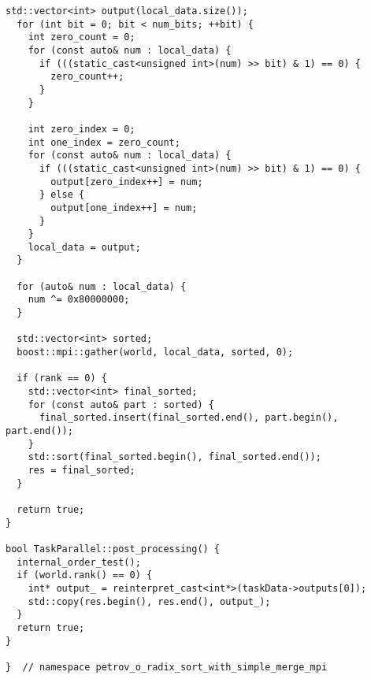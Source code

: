 \documentclass[12pt]{article}
\begin{document}
\begin{lstlisting}[caption={Файл реализации параллельной версии поразрядной сортировки}]
  std::vector<int> output(local_data.size());
  for (int bit = 0; bit < num_bits; ++bit) {
    int zero_count = 0;
    for (const auto& num : local_data) {
      if (((static_cast<unsigned int>(num) >> bit) & 1) == 0) {
        zero_count++;
      }
    }

    int zero_index = 0;
    int one_index = zero_count;
    for (const auto& num : local_data) {
      if (((static_cast<unsigned int>(num) >> bit) & 1) == 0) {
        output[zero_index++] = num;
      } else {
        output[one_index++] = num;
      }
    }
    local_data = output;
  }

  for (auto& num : local_data) {
    num ^= 0x80000000;
  }

  std::vector<int> sorted;
  boost::mpi::gather(world, local_data, sorted, 0);

  if (rank == 0) {
    std::vector<int> final_sorted;
    for (const auto& part : sorted) {
      final_sorted.insert(final_sorted.end(), part.begin(), part.end());
    }
    std::sort(final_sorted.begin(), final_sorted.end());
    res = final_sorted;
  }

  return true;
}

bool TaskParallel::post_processing() {
  internal_order_test();
  if (world.rank() == 0) {
    int* output_ = reinterpret_cast<int*>(taskData->outputs[0]);
    std::copy(res.begin(), res.end(), output_);
  }
  return true;
}

}  // namespace petrov_o_radix_sort_with_simple_merge_mpi
\end{lstlisting}
\end{document}
